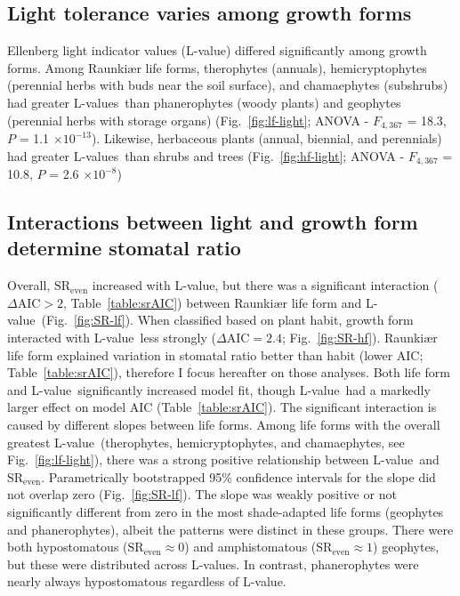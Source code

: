 \documentclass[12pt, oneside]{article}
\newcommand{\el}{L-value}
\newcommand{\els}{L-values}
\begin{document}
\subsection*{Light tolerance varies among growth forms}

Ellenberg light indicator values (\el) differed significantly among growth forms. Among Raunki\ae r life forms, therophytes (annuals), hemicryptophytes (perennial herbs with buds near the soil surface), and chamaephytes (subshrubs) had greater \els~than phanerophytes (woody plants) and geophytes (perennial herbs with storage organs) (Fig.~\ref{fig:lf-light}; ANOVA - $F_{4, 367}$ = 18.3, $P$ = 1.1 $\times10^{-13}$). Likewise, herbaceous plants (annual, biennial, and perennials) had greater \els~than shrubs and trees (Fig.~\ref{fig:hf-light}; ANOVA - $F_{4, 367}$ = 10.8, $P$ = 2.6 $\times10^{-8}$)

\subsection*{Interactions between light and growth form determine stomatal ratio}

Overall, $\mathrm{SR_{even}}$ increased with \el, but there was a significant interaction ($\Delta\mathrm{AIC} > 2$, Table~\ref{table:srAIC}) between Raunki\ae r life form and \el~(Fig.~\ref{fig:SR-lf}). When classified based on plant habit, growth form interacted with \el~less strongly ($\Delta \textrm{AIC} = 2.4$; Fig.~\ref{fig:SR-hf}). Raunki\ae r life form explained variation in stomatal ratio better than habit (lower AIC; Table~\ref{table:srAIC}), therefore I focus hereafter on those analyses. Both life form and \el~significantly increased model fit, though \el~had a markedly larger effect on model AIC (Table~\ref{table:srAIC}). The significant interaction is caused by different slopes between life forms. Among life forms with the overall greatest \el~(therophytes, hemicryptophytes, and chamaephytes, see Fig.~\ref{fig:lf-light}), there was a strong positive relationship between \el~and $\mathrm{SR_{even}}$. Parametrically bootstrapped 95\% confidence intervals for the slope did not overlap zero (Fig.~\ref{fig:SR-lf}). The slope was weakly positive or not significantly different from zero in the most shade-adapted life forms (geophytes and phanerophytes), albeit the patterns were distinct in these groups. There were both hypostomatous ($\mathrm{SR_{even}} \approx 0$) and amphistomatous ($\mathrm{SR_{even}} \approx 1$) geophytes, but these were distributed across \els. In contrast, phanerophytes were nearly always hypostomatous regardless of \el. 
\end{document}
